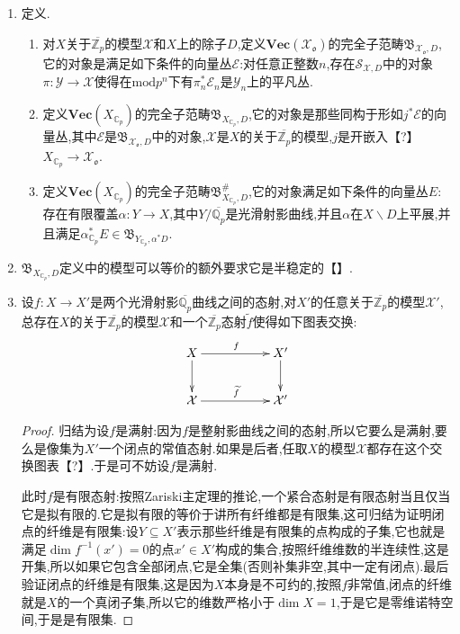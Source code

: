 \begin{enumerate}
\begin{proof}
	\end{proof}
    \item 定义.
    \begin{enumerate}[(1)]
        \item 对$X$关于$\overline{\mathbb{Z}_p}$的模型$\mathcal{X}$和$X$上的除子$D$,定义$\textbf{Vec}(\mathcal{X}_{\mathfrak{o}})$的完全子范畴$\mathfrak{B}_{\mathcal{X}_{\mathfrak{o}},D}$,它的对象是满足如下条件的向量丛$\mathcal{E}$:对任意正整数$n$,存在$\mathcal{S}_{\mathcal{X},D}$中的对象$\pi:\mathcal{Y}\to\mathcal{X}$使得在$\mathrm{mod}p^n$下有$\pi_n^*\mathcal{E}_n$是$\mathcal{Y}_n$上的平凡丛.
        \item 定义$\textbf{Vec}(X_{\mathbb{C}_p})$的完全子范畴$\mathfrak{B}_{X_{\mathbb{C}_p},D}$,它的对象是那些同构于形如$j^*\mathcal{E}$的向量丛,其中$\mathcal{E}$是$\mathfrak{B}_{\mathcal{X}_{\mathfrak{o}},D}$中的对象,$\mathcal{X}$是$X$的关于$\overline{\mathbb{Z}_p}$的模型,$j$是开嵌入【?】$X_{\mathbb{C}_p}\to\mathcal{X}_{\mathfrak{o}}$.
        \item 定义$\textbf{Vec}(X_{\mathbb{C}_p})$的完全子范畴$\mathfrak{B}^{\#}_{X_{\mathbb{C}_p},D}$,它的对象满足如下条件的向量丛$E$:存在有限覆盖$\alpha:Y\to X$,其中$Y/\overline{\mathbb{Q}_p}$是光滑射影曲线,并且$\alpha$在$X\backslash D$上平展,并且满足$\alpha^*_{\mathbb{C}_p}E\in\mathfrak{B}_{Y_{\mathbb{C}_p},\alpha^*D}$.
    \end{enumerate}
    \item $\mathfrak{B}_{X_{\mathbb{C}_p},D}$定义中的模型可以等价的额外要求它是半稳定的【】.
    \item 设$f:X\to X'$是两个光滑射影$\overline{\mathbb{Q}_p}$曲线之间的态射,对$X'$的任意关于$\overline{\mathbb{Z}_p}$的模型$\mathcal{X}'$,总存在$X$的关于$\overline{\mathbb{Z}_p}$的模型$\mathcal{X}$和一个$\overline{\mathbb{Z}_p}$态射$\widetilde{f}$使得如下图表交换:
    $$\xymatrix{X\ar[rr]^f\ar[d]&&X'\ar[d]\\\mathcal{X}\ar[rr]^{\widetilde{f}}&&\mathcal{X}'}$$
    \begin{proof}
    	
    	归结为设$f$是满射:因为$f$是整射影曲线之间的态射,所以它要么是满射,要么是像集为$X'$一个闭点的常值态射.如果是后者,任取$X$的模型$\mathcal{X}$都存在这个交换图表【?】.于是可不妨设$f$是满射.
    	
    	\qquad
    	
    	此时$f$是有限态射:按照Zariski主定理的推论,一个紧合态射是有限态射当且仅当它是拟有限的.它是拟有限的等价于讲所有纤维都是有限集,这可归结为证明闭点的纤维是有限集:设$Y\subseteq X'$表示那些纤维是有限集的点构成的子集,它也就是满足$\dim f^{-1}(x')=0$的点$x'\in X'$构成的集合,按照纤维维数的半连续性,这是开集,所以如果它包含全部闭点,它是全集(否则补集非空,其中一定有闭点).最后验证闭点的纤维是有限集,这是因为$X$本身是不可约的,按照$f$非常值,闭点的纤维就是$X$的一个真闭子集,所以它的维数严格小于$\dim X=1$,于是它是零维诺特空间,于是是有限集.
    	

\end{proof}
\end{enumerate}
